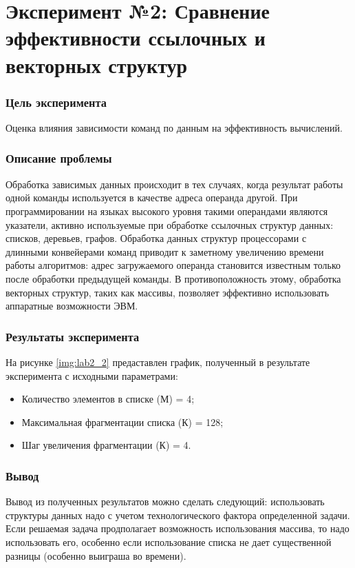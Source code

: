 \chapter*{Эксперимент №2: Сравнение эффективности ссылочных и векторных структур}

\subsection*{Цель эксперимента}
Оценка влияния зависимости команд по данным на эффективность вычислений. 

\subsection*{Описание проблемы}
Обработка зависимых данных происходит в тех случаях, когда результат работы одной команды используется в качестве адреса операнда другой. При программировании на языках высокого уровня такими операндами являются указатели, активно используемые при обработке ссылочных структур данных: списков, деревьев, графов. Обработка данных структур процессорами с длинными конвейерами команд приводит к заметному увеличению времени работы алгоритмов: адрес загружаемого операнда становится известным только после обработки предыдущей команды. В противоположность этому, обработка векторных структур, таких как массивы, позволяет эффективно использовать аппаратные возможности ЭВМ. 

\subsection*{Результаты эксперимента}
На рисунке \ref{img:lab2_2} предаставлен график, полученный в результате эксперимента с исходными параметрами:
\begin{itemize}
	\item Количество элементов в списке (М) = 4;
	\item Максимальная фрагментации списка (К) = 128;
	\item Шаг увеличения фрагментации (К) = 4.
\end{itemize}

\newpage

\subsection*{Вывод}
Вывод из полученных результатов можно сделать следующий: использовать структуры данных надо с учетом технологического фактора определенной задачи. Если решаемая задача продполагает возможность использования массива, то надо использовать его, особенно если использование списка не дает существенной разницы (особенно выиграша во времени).



